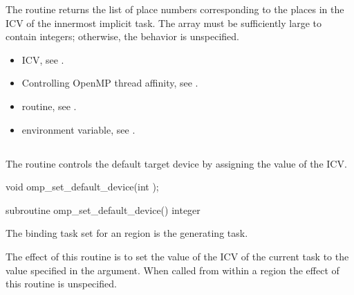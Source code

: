 \effect
The  routine returns the list of 
place numbers corresponding to the places in the  
ICV of the innermost implicit task. The array must be sufficiently large 
to contain  integers; otherwise, 
the behavior is unspecified.

\crossreferences
\begin{itemize}
\item {} ICV, see 
.

\item Controlling OpenMP thread affinity, see 
. 

\item {} routine, see 
.

\item {} environment variable, see 
.
\end{itemize}





\subsection{}
\label{subsec:omp_set_default_device}

\summary

The  routine controls the default target device by 
assigning the value of the  ICV.

\format
\ccppspecificstart
\begin{boxedcode}
void omp\_set\_default\_device(int );
\end{boxedcode}
\ccppspecificend

\fortranspecificstart
\begin{boxedcode}
subroutine omp\_set\_default\_device()
integer 
\end{boxedcode}
\fortranspecificend

\binding
The binding task set for an  region is the generating 
task.

\effect
The effect of this routine is to set the value of the  ICV of the current 
task to the value specified in the argument. When called from within a  region 
the effect of this routine is unspecified.

